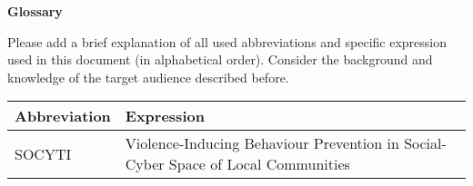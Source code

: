 \documentclass{socyti}
\begin{document}
    {\Large\textbf{Glossary}}

    Please add a brief explanation of all used abbreviations and specific expression used in this document (in alphabetical order). Consider the background and knowledge of the target audience described before.

    \begin{table}[h]
        \begin{tabularx}{\textwidth}{|l|X|}
            \hline
            \rowcolor{rowgray}
            Abbreviation & Expression \\
            \hline
            SOCYTI & Violence-Inducing Behaviour Prevention in Social-Cyber Space of Local Communities \\
            \hline
        \end{tabularx}
    \end{table}

    \newpage


    \setcounter{page}{1}

     \newpage
     \newpage

    \printbibliography

\end{document}
